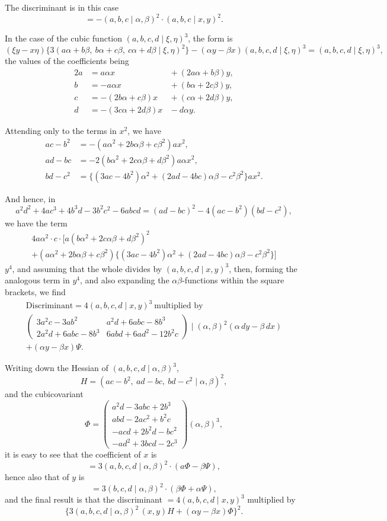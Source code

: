 \documentclass[11pt,a4paper]{book}
\begin{document}
The discriminant is in this case
\[
= -(a,b,c\mid\alpha,\beta)^2\cdot(a,b,c\mid x,y)^2.
\]

In the case of the cubic function $(a,b,c,d\mid\xi,\eta)^3$, the form is
\[
(\xi y-x\eta)\{3(a\alpha+b\beta,\ b\alpha+c\beta,\ c\alpha+d\beta\mid\xi,\eta)^2\}
-(\alpha y-\beta x)(a,b,c,d\mid\xi,\eta)^3
= (a,b,c,d\mid\xi,\eta)^3,
\]
the values of the coefficients being
\begin{alignat*}{2}
a &= a\alpha x &{}+ (2a\alpha+b\beta)y,\\
b &= -a\alpha x &{}+ (b\alpha+2c\beta)y,\\
c &= -(2b\alpha+c\beta)x &{}+ (c\alpha+2d\beta)y,\\
d &= -(3c\alpha+2d\beta)x &{}- d\alpha y.
\end{alignat*}

Attending only to the terms in $x^2$, we have
\begin{align*}
ac-b^2 &= -(a\alpha^2+2b\alpha\beta+c\beta^2)ax^2,\\
ad-bc &= -2(b\alpha^2+2c\alpha\beta+d\beta^2)a\alpha x^2,\\
bd-c^2 &= \{(3ac-4b^2)\alpha^2+(2ad-4bc)\alpha\beta-c^2\beta^2\}ax^2.
\end{align*}

And hence, in
\[
a^2d^2+4ac^3+4b^3d-3b^2c^2-6abcd
= (ad-bc)^2-4(ac-b^2)(bd-c^2),
\]
we have the term
\begin{multline*}
4a\alpha^2\cdot c\cdot[a(b\alpha^2+2c\alpha\beta+d\beta^2)^2\\
+(a\alpha^2+2b\alpha\beta+c\beta^2)
\{(3ac-4b^2)\alpha^2+(2ad-4bc)\alpha\beta-c^2\beta^2\}]
\end{multline*}
$y^4$, and assuming that the whole divides by $(a,b,c,d\mid x,y)^3$, then,
forming the analogous term in $y^4$, and also expanding the $\alpha\beta$-functions
within the square brackets, we find
\begin{multline*}
\text{Discriminant} = 4(a,b,c,d\mid x,y)^3\ \text{multiplied by}\\
\begin{pmatrix}
3a^2c-3ab^2 & a^2d+6abc-8b^3 \\
2a^2d+6abc-8b^3 & 6abd+6ad^2-12b^2c
\end{pmatrix}
\mid(\alpha,\beta)^2(\alpha\,dy-\beta\,dx)\\
+ (\alpha y-\beta x)\Psi.
\end{multline*}

Writing down the Hessian of $(a,b,c,d\mid\alpha,\beta)^3$,
\[
H = (ac-b^2,\ ad-bc,\ bd-c^2\mid\alpha,\beta)^2,
\]
and the cubicovariant
\[
\Phi =
\begin{pmatrix}
a^2d-3abc+2b^3\\
abd-2ac^2+b^2c\\
-acd+2b^2d-bc^2\\
-ad^2+3bcd-2c^3
\end{pmatrix}
(\alpha,\beta)^3,
\]
it is easy to see that the coefficient of $x$ is
\[
= 3(a,b,c,d\mid\alpha,\beta)^2\cdot(a\Phi-\beta\Psi),
\]
hence also that of $y$ is
\[
= 3(b,c,d\mid\alpha,\beta)^2\cdot(\beta\Phi+\alpha\Psi),
\]
and the final result is that the discriminant $=4(a,b,c,d\mid x,y)^3$
multiplied by
\[
\{3(a,b,c,d\mid\alpha,\beta)^2\,(x,y)H+(\alpha y-\beta x)\Phi\}^2.
\]
\end{document}
